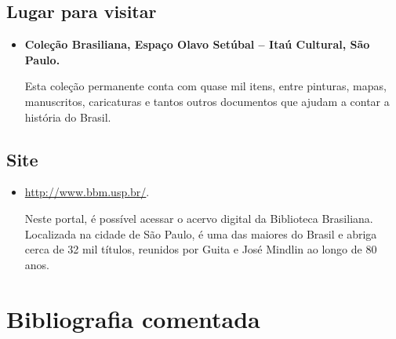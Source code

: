 \documentclass[12pt]{extarticle}
\begin{document}
\subsection{Lugar para visitar}

\begin{itemize}
\item\textbf{Coleção Brasiliana, Espaço Olavo Setúbal -- Itaú Cultural, São Paulo.}

Esta coleção permanente conta com quase mil itens, entre pinturas,
mapas, manuscritos, caricaturas e tantos outros documentos que ajudam a
contar a história do Brasil.
\end{itemize}

\subsection{Site}

\begin{itemize}
\item\url{http://www.bbm.usp.br/}.

Neste portal, é possível acessar o acervo digital da Biblioteca
Brasiliana. Localizada na cidade de São Paulo, é uma das maiores do
Brasil e abriga cerca de 32 mil títulos, reunidos por Guita e José
Mindlin ao longo de 80 anos.
\end{itemize}

\section{Bibliografia comentada}
\end{document}
